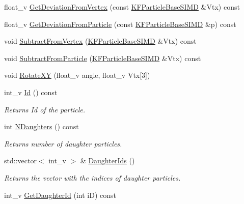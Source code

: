 \begin{DoxyCompactItemize}
\item 
float\+\_\+v \hyperlink{classKFParticleBaseSIMD_a43d3005745f3c408f2cf6296e72870b3}{Get\+Deviation\+From\+Vertex} (const \hyperlink{classKFParticleBaseSIMD}{K\+F\+Particle\+Base\+S\+I\+MD} \&Vtx) const 
\item 
float\+\_\+v \hyperlink{classKFParticleBaseSIMD_a2f5e730fa0ac84f5ac2559b5a358328b}{Get\+Deviation\+From\+Particle} (const \hyperlink{classKFParticleBaseSIMD}{K\+F\+Particle\+Base\+S\+I\+MD} \&p) const 
\item 
void \hyperlink{classKFParticleBaseSIMD_a15202c15c0476824b316a7edc5783ca0}{Subtract\+From\+Vertex} (\hyperlink{classKFParticleBaseSIMD}{K\+F\+Particle\+Base\+S\+I\+MD} \&Vtx) const 
\item 
void \hyperlink{classKFParticleBaseSIMD_ad7bdaa7cad85e3157f53aedc60a9f2d8}{Subtract\+From\+Particle} (\hyperlink{classKFParticleBaseSIMD}{K\+F\+Particle\+Base\+S\+I\+MD} \&Vtx) const 
\item 
void \hyperlink{classKFParticleBaseSIMD_a2fc8aa6e9722f33468d0d1817bda46d9}{Rotate\+XY} (float\+\_\+v angle, float\+\_\+v Vtx\mbox{[}3\mbox{]})
\item 
int\+\_\+v \hyperlink{classKFParticleBaseSIMD_a4f43f26357ae4a6e35ca5b8e4a1d623f}{Id} () const \hypertarget{classKFParticleBaseSIMD_a4f43f26357ae4a6e35ca5b8e4a1d623f}{}\label{classKFParticleBaseSIMD_a4f43f26357ae4a6e35ca5b8e4a1d623f}

\begin{DoxyCompactList}\small\item\em Returns Id of the particle. \end{DoxyCompactList}\item 
int \hyperlink{classKFParticleBaseSIMD_a575650529485dfca810314581d68e469}{N\+Daughters} () const \hypertarget{classKFParticleBaseSIMD_a575650529485dfca810314581d68e469}{}\label{classKFParticleBaseSIMD_a575650529485dfca810314581d68e469}

\begin{DoxyCompactList}\small\item\em Returns number of daughter particles. \end{DoxyCompactList}\item 
std\+::vector$<$ int\+\_\+v $>$ \& \hyperlink{classKFParticleBaseSIMD_ac827f191d739ef99b5bee7ebc97d5313}{Daughter\+Ids} ()\hypertarget{classKFParticleBaseSIMD_ac827f191d739ef99b5bee7ebc97d5313}{}\label{classKFParticleBaseSIMD_ac827f191d739ef99b5bee7ebc97d5313}

\begin{DoxyCompactList}\small\item\em Returns the vector with the indices of daughter particles. \end{DoxyCompactList}\item 
int\+\_\+v \hyperlink{classKFParticleBaseSIMD_ac57b8345a161bd445b3cea5bc23b0210}{Get\+Daughter\+Id} (int iD) const \hypertarget{classKFParticleBaseSIMD_ac57b8345a161bd445b3cea5bc23b0210}{}\label{classKFParticleBaseSIMD_ac57b8345a161bd445b3cea5bc23b0210}


\end{DoxyCompactItemize}

